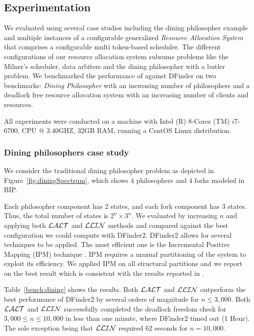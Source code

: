 \subsection{Experimentation}
\label{s:experiments}
%

We evaluated \deadlocktool{} using several case studies including the dining philosopher example and multiple instances
of a configurable generalized {\em Resource Allocation System} that comprises 
a configurable multi token-based scheduler.
The different configurations of our resource allocation system subsume problems like the Milner's scheduler, 
data arbiters and the dining philosopher with a butler problem. 
We benchmarked the performance of \deadlocktool{} against DFinder \cite{DFinder2}
on two benchmarks: 
{\em Dining Philosopher} with an increasing number of philosophers and 
a deadlock free resource allocation system with an increasing number of clients and resources. 

All experiments were conducted on a machine with Intel (R) $8$-Cores (TM) $i7$-$6700$, CPU @ $3.40$GHZ, $32$GB RAM, 
running a CentOS Linux distribution. 

\subsubsection{Dining philosophers case study} 
We consider the traditional dining philosopher problem as depicted in 
Figure~\ref{fig:diningSpectrum}, which shows $4$ philosophers and $4$ forks modeled in BIP. 

Each philosopher component has $2$ states, and each fork component has $3$ states. 
Thus, the total number of states is $2^n \times 3^n$. 
We evaluated \deadlocktool{} by increasing $n$ and applying both $\mathcal{LALT}$ and $\mathcal{LLIN}$ methods and compared against the best configuration 
we could compute with DFinder2. 
DFinder2 allows for several techniques to be applied. The most efficient one is 
the Incremental Positive Mapping (IPM) technique \cite{DFinder2}. 
IPM requires a manual partitioning of the system to exploit its efficiency. 
We applied IPM on all structural partitions and we report on the best result which is consistent 
with the results reported in . 

Table~\ref{bench:dining} shows the results. Both $\mathcal{LALT}$ and $\mathcal{LLIN}$ outperform the best performance of DFinder2 by several orders of magnitude 
for $n\leq 3,000$. Both $\mathcal{LALT}$ and $\mathcal{LLIN}$ successfully completed the deadlock freedom check for $3,000 \leq n \leq 10,000$ 
in less than one minute, where DFinder2 timed out (1 Hour). The sole exception being that
$\mathcal{LLIN}$ required $62$ seconds for $n=10,000$. 


